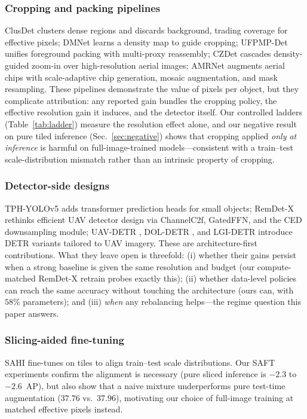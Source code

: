 \documentclass[journal]{IEEEtran}
\newcommand{\ap}{\textup{AP}}
\newcommand{\remdet}{RemDet-X}
\begin{document}
\subsubsection{Cropping and packing pipelines}
ClusDet \cite{clusdet} clusters dense regions and discards background, trading coverage for effective pixels; DMNet \cite{dmnet} learns a density map to guide cropping; UFPMP-Det \cite{ufpmp} unifies foreground packing with multi-proxy reassembly; CZDet \cite{czdet} cascades density-guided zoom-in over high-resolution aerial images; AMRNet \cite{amrnet} augments aerial chips with scale-adaptive chip generation, mosaic augmentation, and mask resampling. These pipelines demonstrate the value of pixels per object, but they complicate attribution: any reported gain bundles the cropping policy, the effective resolution gain it induces, and the detector itself. Our controlled ladders (Table~\ref{tab:ladder}) measure the resolution effect alone, and our negative result on pure tiled inference (Sec.~\ref{sec:negative}) shows that cropping applied \emph{only at inference} is harmful on full-image-trained models---consistent with a train--test scale-distribution mismatch rather than an intrinsic property of cropping.
\subsubsection{Detector-side designs}
TPH-YOLOv5 \cite{tph} adds transformer prediction heads for small objects; \remdet{} \cite{remdet} rethinks efficient UAV detector design via ChannelC2f, GatedFFN, and the CED downsampling module; UAV-DETR \cite{uavdetr}, DOL-DETR \cite{doldetr}, and LGI-DETR \cite{lgidetr} introduce DETR variants tailored to UAV imagery. These are architecture-first contributions. What they leave open is threefold: (i) whether their gains persist when a strong baseline is given the same resolution and budget (our compute-matched \remdet{} retrain probes exactly this); (ii) whether data-level policies can reach the same accuracy without touching the architecture (ours can, with $58\%$ parameters); and (iii) \emph{when} any rebalancing helps---the regime question this paper answers.
\subsubsection{Slicing-aided fine-tuning}
SAHI \cite{sahi} fine-tunes on tiles to align train--test scale distributions. Our SAFT experiments confirm the alignment is necessary (pure sliced inference is $-2.3$ to $-2.6$~\ap), but also show that a naive mixture underperforms pure test-time augmentation ($37.76$ vs.\ $37.96$), motivating our choice of full-image training at matched effective pixels instead.
\end{document}
